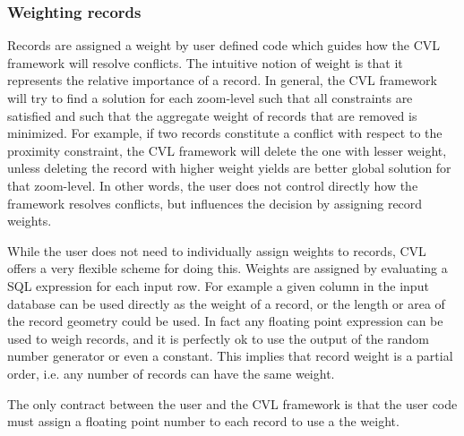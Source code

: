 
\subsubsection{Weighting records}
Records are assigned a weight by user defined code which guides how the CVL framework will resolve conflicts.  The intuitive notion of weight is that it represents the relative importance of a record. In general, the CVL framework will try to find a solution for each zoom-level such that all constraints are  satisfied and such that the aggregate weight of records that are removed is minimized. For example, if two records constitute a conflict with respect to the proximity constraint, the CVL framework will delete the one with lesser weight, unless deleting the record with higher weight yields are better global solution for that zoom-level. In other words, the user does not control directly how the framework resolves conflicts, but influences the decision by assigning record weights. 

While the user does not need to individually assign weights to records, CVL offers a very flexible scheme for doing this. Weights are assigned by evaluating a SQL expression for each input row. For example a given column in the input database can be used directly as the weight of a record, or the length or area of the record geometry could be used. In fact any floating point expression can be used to weigh records, and it is perfectly ok to use the output of the random number generator or even a constant. This implies that record weight is a partial order, i.e. any number of records can have the same weight.

The only contract between the user and the CVL framework is that the user code must assign a floating point number to each record to use a the weight.


